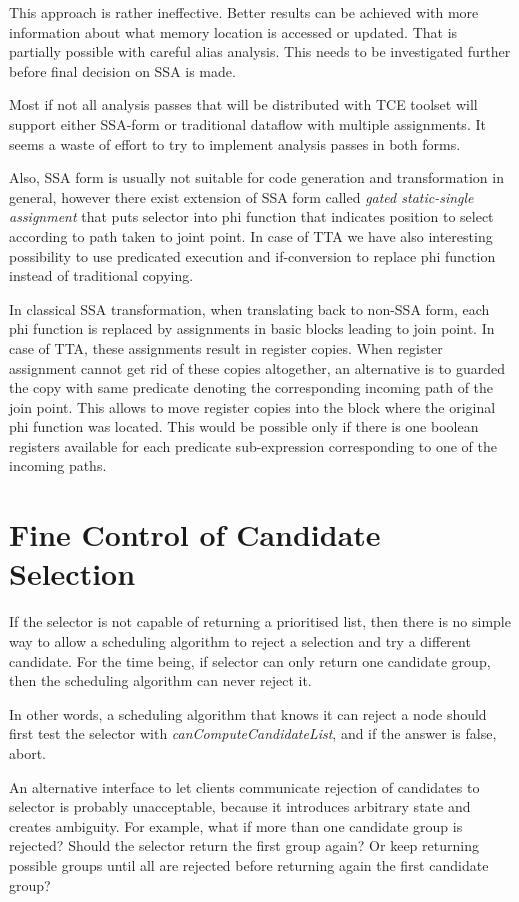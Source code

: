 \documentclass[a4paper,twoside]{tce}
\begin{document}
This approach is rather ineffective. Better results can be achieved
with more information about what memory location is accessed or updated.
That is partially possible with careful alias analysis.
This needs to be investigated further before final decision on SSA is made.

Most if not all analysis passes that will be distributed with TCE toolset
will support either SSA-form or traditional dataflow with multiple
assignments. It seems a waste of effort to try to implement analysis passes
in both forms.

Also, SSA form is usually not suitable for code generation and
transformation in general, however there exist extension of SSA form called
\emph{gated static-single assignment} that puts selector into phi function
that indicates position to select according to path taken to joint point.
In case of TTA we have also interesting possibility to use predicated
execution and if-conversion to replace phi function instead of traditional
copying.

In classical SSA transformation, when translating back to non-SSA form, each
phi function is replaced by assignments in basic blocks leading to join
point. In case of TTA, these assignments result in register copies. When
register assignment cannot get rid of these copies altogether, an
alternative is to guarded the copy with same predicate denoting the
corresponding incoming path of the join point. This allows to move register
copies into the block where the original phi function was located. This
would be possible only if there is one boolean registers available for each
predicate sub-expression corresponding to one of the incoming paths.

\section{Fine Control of Candidate Selection}
\label{ch:pending:candidate-lists}

If the selector is not capable of returning a prioritised list, then there
is no simple way to allow a scheduling algorithm to reject a selection and
try a different candidate. For the time being, if selector can only return
one candidate group, then the scheduling algorithm can never reject it.

In other words, a scheduling algorithm that knows it can reject a node
should first test the selector with \emph{canComputeCandidateList}, and if
the answer is false, abort.

An alternative interface to let clients communicate rejection of candidates
to selector is probably unacceptable, because it introduces arbitrary state
and creates ambiguity. For example, what if more than one candidate group
is rejected? Should the selector return the first group again? Or keep
returning possible groups until all are rejected before returning again the
first candidate group?
\end{document}
